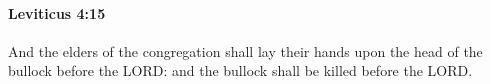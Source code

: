 
		\paragraph{Leviticus 4:15} %
			\label{LEVITICUS-4-15}

			And the elders of the congregation shall lay their hands upon the head of the bullock before the LORD: and the bullock shall be killed before the LORD.


